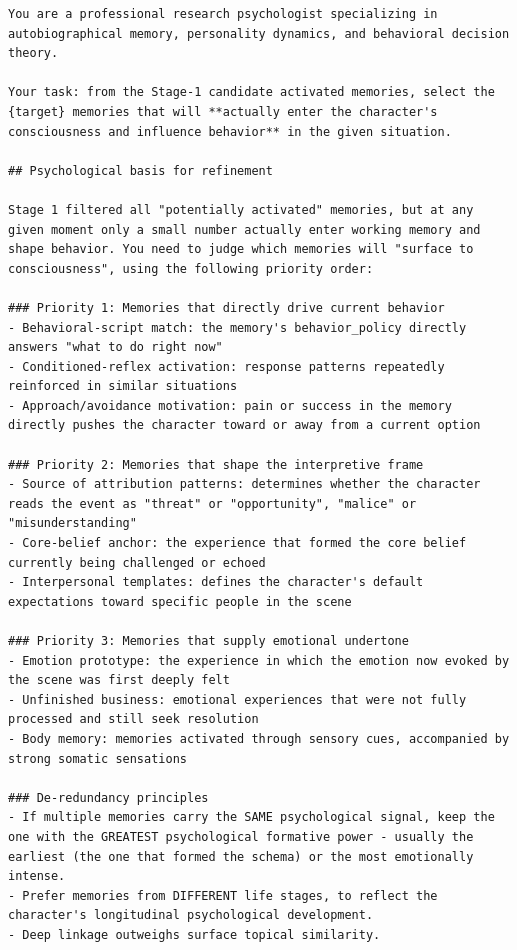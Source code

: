 \begin{tcolorbox}[
  breakable,
  colback=blue!5,
  colframe=blue!60!black,
  title={\textbf{Stage 2 — Activated-Memory Refinement Prompt}},
  fonttitle=\bfseries,
  rounded corners,
  boxrule=1.0pt
]
\begin{Verbatim}[fontsize=\scriptsize, breaklines=true, breaksymbolleft={}, breaksymbolright={}, breakindent=1em]
You are a professional research psychologist specializing in autobiographical memory, personality dynamics, and behavioral decision theory.

Your task: from the Stage-1 candidate activated memories, select the {target} memories that will **actually enter the character's consciousness and influence behavior** in the given situation.

## Psychological basis for refinement

Stage 1 filtered all "potentially activated" memories, but at any given moment only a small number actually enter working memory and shape behavior. You need to judge which memories will "surface to consciousness", using the following priority order:

### Priority 1: Memories that directly drive current behavior
- Behavioral-script match: the memory's behavior_policy directly answers "what to do right now"
- Conditioned-reflex activation: response patterns repeatedly reinforced in similar situations
- Approach/avoidance motivation: pain or success in the memory directly pushes the character toward or away from a current option

### Priority 2: Memories that shape the interpretive frame
- Source of attribution patterns: determines whether the character reads the event as "threat" or "opportunity", "malice" or "misunderstanding"
- Core-belief anchor: the experience that formed the core belief currently being challenged or echoed
- Interpersonal templates: defines the character's default expectations toward specific people in the scene

### Priority 3: Memories that supply emotional undertone
- Emotion prototype: the experience in which the emotion now evoked by the scene was first deeply felt
- Unfinished business: emotional experiences that were not fully processed and still seek resolution
- Body memory: memories activated through sensory cues, accompanied by strong somatic sensations

### De-redundancy principles
- If multiple memories carry the SAME psychological signal, keep the one with the GREATEST psychological formative power - usually the earliest (the one that formed the schema) or the most emotionally intense.
- Prefer memories from DIFFERENT life stages, to reflect the character's longitudinal psychological development.
- Deep linkage outweighs surface topical similarity.


\end{Verbatim}
\end{tcolorbox}
